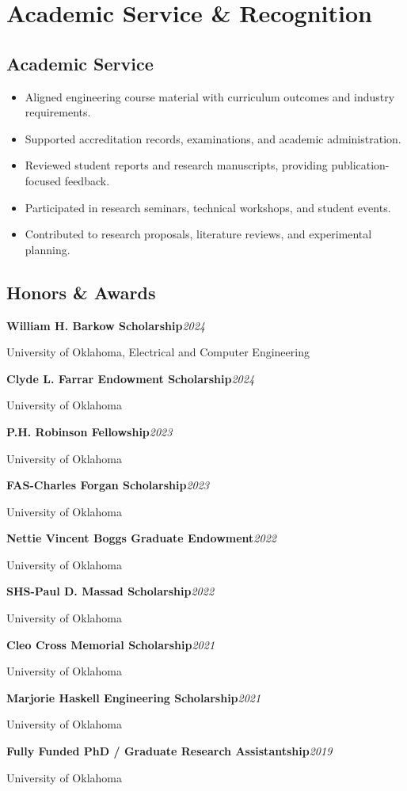 \documentclass[9pt,letterpaper]{extarticle}
\newcommand{\entry}[2]{\Needspace{4\baselineskip}\textbf{#1}\hfill\textit{#2}\par}
\begin{document}
\section{Academic Service \& Recognition}
\subsection{Academic Service}
\begin{itemize}
\item Aligned engineering course material with curriculum outcomes and industry requirements.
\item Supported accreditation records, examinations, and academic administration.
\item Reviewed student reports and research manuscripts, providing publication-focused feedback.
\item Participated in research seminars, technical workshops, and student events.
\item Contributed to research proposals, literature reviews, and experimental planning.
\end{itemize}
\subsection{Honors \& Awards}
\entry{William H. Barkow Scholarship}{2024}
{\small University of Oklahoma, Electrical and Computer Engineering\par}
\entry{Clyde L. Farrar Endowment Scholarship}{2024}
{\small University of Oklahoma\par}
\entry{P.H. Robinson Fellowship}{2023}
{\small University of Oklahoma\par}
\entry{FAS-Charles Forgan Scholarship}{2023}
{\small University of Oklahoma\par}
\entry{Nettie Vincent Boggs Graduate Endowment}{2022}
{\small University of Oklahoma\par}
\entry{SHS-Paul D. Massad Scholarship}{2022}
{\small University of Oklahoma\par}
\entry{Cleo Cross Memorial Scholarship}{2021}
{\small University of Oklahoma\par}
\entry{Marjorie Haskell Engineering Scholarship}{2021}
{\small University of Oklahoma\par}
\entry{Fully Funded PhD / Graduate Research Assistantship}{2019}
{\small University of Oklahoma\par}
\end{document}
